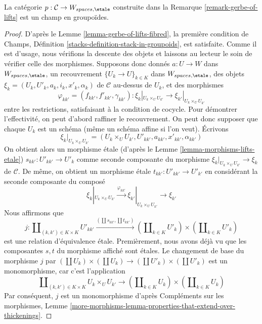 \begin{lemma}
\label{lemma-gerbe-of-lifts-stack}
La catégorie $p : \mathcal{C} \to W_{spaces, \etale}$ construite
dans la Remarque \ref{remark-gerbe-of-lifts} est un champ en groupoïdes.
\end{lemma}

\begin{proof}
D'après le Lemme \ref{lemma-gerbe-of-lifts-fibred}, la première condition
de Champs, Définition \ref{stacks-definition-stack-in-groupoids}, est satisfaite.
Comme il est d'usage, nous vérifions la descente des objets et laissons au lecteur
le soin de vérifier celle des morphismes. Supposons donc donnés $a : U \to W$
dans $W_{spaces, \etale}$, un recouvrement $\{U_k \to U\}_{k \in K}$ dans
$W_{spaces, \etale}$, des objets $\xi_k = (U_k, U'_k, a_k, i_k, x'_k, \alpha_k)$
de $\mathcal{C}$ au-dessus de $U_k$, et des morphismes
$$
\varphi_{kk'} = (f_{kk'}, f'_{kk'}, \gamma_{kk'}) :
\xi_k|_{U_k \times_U U_{k'}} \to
\xi_{k'}|_{U_k \times_U U_{k'}}
$$
entre les restrictions, satisfaisant à la condition de cocycle. Pour démontrer
l'effectivité, on peut d'abord raffiner le recouvrement. On peut donc supposer que chaque
$U_k$ est un schéma (même un schéma affine si l'on veut). Écrivons
$$
\xi_k|_{U_k \times_U U_{k'}} =
(U_k \times_U U_{k'}, U'_{kk'}, a_{kk'}, x'_{kk'}, \alpha_{kk'})
$$
On obtient alors un morphisme \'etale (d'après le Lemme \ref{lemma-morphisms-lifts-etale})
$s_{kk'} : U'_{kk'} \to U'_k$
comme seconde composante du morphisme
$\xi_k|_{U_k \times_U U_{k'}} \to \xi_k$ de $\mathcal{C}$.
De même, on obtient un morphisme \'etale $t_{kk'} : U'_{kk'} \to U'_{k'}$
en considérant la seconde composante du composé
$$
\xi_k|_{U_k \times_U U_{k'}} \xrightarrow{\varphi_{kk'}}
\xi_{k'}|_{U_k \times_U U_{k'}} \to \xi_{k'}
$$
Nous affirmons que
$$
j :
\coprod\nolimits_{(k, k') \in K \times K} U'_{kk'}
\xrightarrow{(\coprod s_{kk'}, \coprod t_{kk'})}
(\coprod\nolimits_{k \in K} U'_k) \times (\coprod\nolimits_{k \in K} U'_k)
$$
est une relation d'équivalence \'etale. Premièrement, nous avons déjà vu
que les composantes $s,t$ du morphisme affiché sont \'etales.
Le changement de base du morphisme $j$ par
$(\coprod U_k) \times (\coprod U_k) \to (\coprod U'_k) \times (\coprod U'_k)$
est un monomorphisme, car c'est l'application
$$
\coprod\nolimits_{(k, k') \in K \times K} U_k \times_U U_{k'}
\longrightarrow
(\coprod\nolimits_{k \in K} U_k) \times (\coprod\nolimits_{k \in K} U_k)
$$
Par conséquent, $j$ est un monomorphisme d'après Compléments sur les morphismes, Lemme
\ref{more-morphisms-lemma-properties-that-extend-over-thickenings}.

\end{proof}
